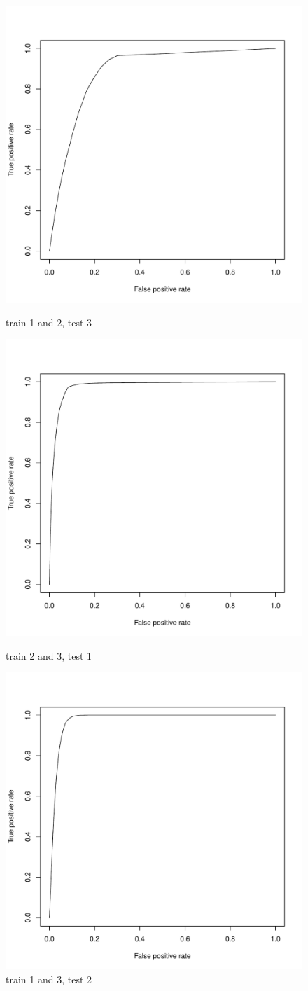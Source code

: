 \documentclass{article}\usepackage[]{graphicx}\usepackage[]{color}
\begin{document}
\begin{figure}[H]
  \includegraphics[width=\linewidth, height = 150pts]{ROC_image8.pdf}
  \caption{train 1 and 2, test 3}
\endminipage
{}
  \includegraphics[width=\linewidth, height = 150pts]{ROC_image1.pdf}
  \caption{train 2 and 3, test 1}
\endminipage
{}
  \includegraphics[width=\linewidth, height = 150pts]{ROC_image2.pdf}
  \caption{train 1 and 3, test 2}
\endminipage

\end{figure}
\end{document}
